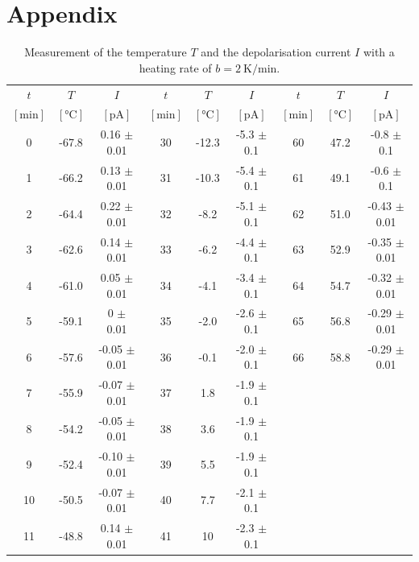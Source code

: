 \newpage
\section{Appendix}
\begin{table}[H]
  \centering
  \caption{Measurement of the temperature $T$ and the depolarisation current $I$ with a heating rate of $b=\qty{2}{\kelvin\per\minute}$.}
  \begin{tabular}{ccc|ccc|ccc}
  \toprule
  $t$ & $T$ & $I$ & $t$ & $T$ & $I$ & $t$ & $T$ & $I$ \\
  $[\mathrm{min}]$ & $[\unit{\celsius}]$ & $[\unit{\pico\ampere}]$ & $[\mathrm{min}]$ & $[\unit{\celsius}]$ & $[\unit{\pico\ampere}]$ & $[\mathrm{min}]$ & $[\unit{\celsius}]$ & $[\unit{\pico\ampere}]$ \\
  \midrule
  0  & -67.8   &   0.16  $\pm$  0.01  &      30 & -12.3   &   -5.3 $\pm$   0.1   &  60 & 47.2  & -0.8  $\pm$  0.1  \\
  1  & -66.2   &   0.13  $\pm$  0.01  &      31 & -10.3   &   -5.4 $\pm$   0.1   &  61 & 49.1  & -0.6  $\pm$  0.1  \\
  2  & -64.4   &   0.22  $\pm$  0.01  &      32 & -8.2    &   -5.1 $\pm$   0.1   &  62 & 51.0  & -0.43 $\pm$  0.01 \\
  3  & -62.6   &   0.14  $\pm$  0.01  &      33 & -6.2    &   -4.4 $\pm$   0.1   &  63 & 52.9  & -0.35 $\pm$  0.01 \\
  4  & -61.0   &   0.05  $\pm$  0.01  &      34 & -4.1    &   -3.4 $\pm$   0.1   &  64 & 54.7  & -0.32 $\pm$  0.01 \\
  5  & -59.1   &   0     $\pm$  0.01  &      35 & -2.0    &   -2.6 $\pm$   0.1   &  65 & 56.8  & -0.29 $\pm$  0.01 \\
  6  & -57.6   &   -0.05 $\pm$  0.01  &      36 & -0.1    &   -2.0 $\pm$   0.1   &  66 & 58.8  & -0.29 $\pm$  0.01 \\
  7  & -55.9   &   -0.07 $\pm$  0.01  &      37 & 1.8     &   -1.9 $\pm$   0.1  &   &   & \\
  8  & -54.2   &   -0.05 $\pm$  0.01  &      38 & 3.6     &   -1.9 $\pm$   0.1  &   &   & \\
  9  & -52.4   &   -0.10 $\pm$  0.01  &      39 & 5.5     &   -1.9 $\pm$   0.1  &   &   & \\
  10 & -50.5   &   -0.07 $\pm$  0.01  &      40 & 7.7     &   -2.1 $\pm$   0.1  &   &   & \\
  11 & -48.8   &   0.14  $\pm$  0.01  &      41 & 10      &   -2.3 $\pm$   0.1  &   &   & \\

\end{tabular}
\end{table}
